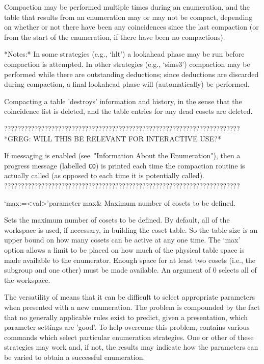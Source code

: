 Compaction may be performed  multiple times during an enumeration, and
the table that results from an  enumeration may or may not be compact,
depending on whether or not there have been any coincidences since the
last compaction (or  from the start of the  enumeration, if there have
been no compactions).

*Notes:*
In some strategies  (e.g., `hlt') a lookahead phase  may be run before
compaction  is   attempted.   In  other   strategies  (e.g.,  `sims3')
compaction may  be performed  while there are  outstanding deductions;
since deductions  are discarded  during compaction, a  final lookahead
phase will (automatically) be performed.

Compacting a  table 'destroys' information  and history, in  the sense
that the  coincidence list is deleted,  and the table  entries for any
dead cosets are deleted.

??????????????????????????????????????????????????????????????????????
*GREG:
WILL THIS BE RELEVANT FOR INTERACTIVE USE?*

If  messaging is  enabled (see~"Information  About  the Enumeration"),
then a progress  message (labelled {\tt CO}) is  printed each time the
compaction routine is  actually called (as opposed to  each time it is
potentially called).
??????????????????????????????????????????????????????????????????????


    \>`max:=<val>'{parameter max}&
    Maximum number of cosets to be defined.

    Sets the maximum  number of cosets to be defined.   By default, all of
    the workspace is used, if  necessary, in building the coset table.  So
    the table size is  an upper bound on how many cosets  can be active at
    any one  time.  The `max'  option allows a  limit to be placed  on how
    much of the physical table  space is made available to the enumerator.
    Enough  space for  at least  two cosets  (i.e., the  subgroup  and one
    other) must  be made available.  An  argument of 0 selects  all of the
    workspace.

    \enditems



    The versatility  of {\ACE}  means that it  can be difficult  to select
    appropriate  parameters when  presented with  a new  enumeration.  The
    problem is compounded  by the fact that no  generally applicable rules
    exist to  predict, given a presentation, which  parameter settings are
    'good'.   To  help  overcome  this problem,  {\ACE}  contains  various
    commands which select particular enumeration strategies.  One or other
    of these strategies may work and, if not, the results may indicate how
    the parameters can be varied  to obtain a successful enumeration.  

